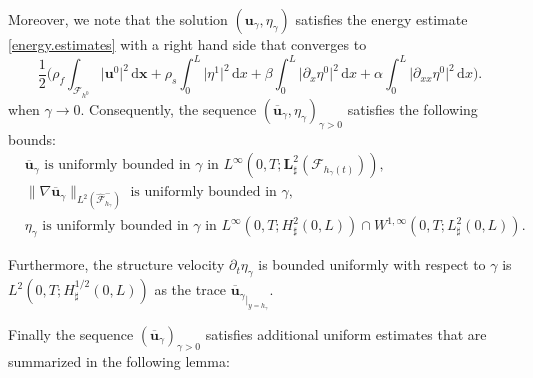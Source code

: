 \documentclass[11pt]{article}
\let\mathcal\mathscr
\theoremstyle{remark}
\theoremstyle{definition}
\newcommand{\ug}{\boldsymbol{u}}
\newcommand{\xg}{\boldsymbol{x}}
\newcommand{\dd}{\,\mathrm{d}}
\newcommand{\BS}[1]{\boldsymbol{#1}}
\begin{document}
Moreover, we note that the solution $(\ug_{\gamma},\eta_{\gamma})$ satisfies the energy estimate \eqref{energy.estimates} with a right hand side that converges to
\[
\frac{1}{2}\biggl(\rho_{f}\int_{\mathcal{F}_{h^0}}\vert\ug^0\vert^{2} \dd \xg+ \rho_{s}\int_{0}^{L}\vert\eta^1\vert^{2}\dd x+\beta\int_{0}^{L}\vert\partial_{x}\eta^0\vert^{2}\dd x+\alpha\int_{0}^{L}\vert\partial_{xx}\eta^0\vert^{2}\dd x\biggr).
\]
when $\gamma \to 0$.
Consequently, the sequence $(\overline{\ug}_{\gamma},\eta_{\gamma})_{\gamma >0}$ satisfies the following bounds:
\begin{align}
&\overline{\ug}_{\gamma}\text{ is uniformly bounded in }\gamma\text{ in }L^{\infty}(0,T;\BS{L}_\sharp^{2}(\mathcal{F}_{h_{\gamma}(t)})),\label{bound-u-1}\\
&\|\nabla\overline{\ug}_{\gamma}\|_{L^2(\widehat{\mathcal F}^{-}_{h_{\gamma}})} \text{ is uniformly bounded in }\gamma,
\label{bound-u-2}\\
&\eta_{\gamma}\text{ is uniformly bounded in }\gamma\text{ in }L^{\infty}(0,T;H^{2}_{\sharp}(0,L))\cap W^{1,\infty}(0,T;L_\sharp^{2}(0,L)).\label{est-eta}
\end{align}

Furthermore, the structure velocity $\partial_t\eta_\gamma$ is bounded uniformly with respect to $\gamma$ is $L^2(0, T ; H^{1/2}_\sharp(0, L))$ as the trace ${\overline{\ug}_{\gamma}}_{\vert_{y=h_{\gamma}}}$.

Finally the sequence $(\overline{\ug}_{\gamma})_{\gamma>0}$ satisfies additional uniform estimates that are summarized in the following lemma:
\end{document}
